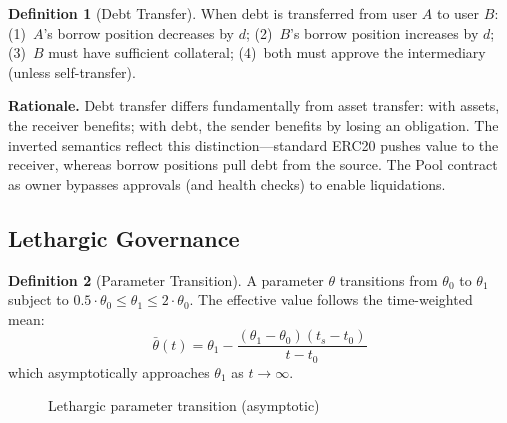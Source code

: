 \documentclass[10pt,a4paper,twocolumn]{article}
\theoremstyle{definition}
\newtheorem{definition}{Definition}[section]
\theoremstyle{plain}
\theoremstyle{remark}
\begin{document}
\begin{definition}[Debt Transfer]
\label{def:debt-transfer}
When debt is transferred from user $A$ to user $B$: (1)~$A$'s borrow position decreases by $d$; (2)~$B$'s borrow position increases by $d$; (3)~$B$ must have sufficient collateral; (4)~both must approve the intermediary (unless self-transfer).
\end{definition}

\textbf{Rationale.} Debt transfer differs fundamentally from asset transfer: with assets, the receiver benefits; with debt, the sender benefits by losing an obligation. The inverted semantics reflect this distinction---standard ERC20 pushes value to the receiver, whereas borrow positions pull debt from the source. The Pool contract as owner bypasses approvals (and health checks) to enable liquidations.

\subsection{Lethargic Governance}
\label{subsec:lethargic-governance}

\begin{definition}[Parameter Transition]
\label{def:param-transition}
A parameter $\theta$ transitions from $\theta_0$ to $\theta_1$ subject to $0.5 \cdot \theta_0 \leq \theta_1 \leq 2 \cdot \theta_0$. The effective value follows the time-weighted mean:
\begin{equation}
\bar{\theta}(t) = \theta_1 - \frac{(\theta_1 - \theta_0)(t_s - t_0)}{t - t_0}
\end{equation}
which asymptotically approaches $\theta_1$ as $t \to \infty$.
\end{definition}

\begin{figure}[htbp]
\centering
{}
\caption{Lethargic parameter transition (asymptotic)}
\label{fig:lethargic-transition}
\end{figure}
\end{document}
